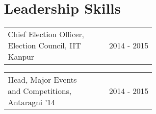 \documentclass[a4paper]{article} %
\newcommand{\verticalspacing}{-0.25cm}
\newcommand{\headspace}{-0.3cm}
\newcommand{\bulletspace}{0.7cm}
\newcommand{\projectheadspacing}{6.9cm}
\newcommand{\gitproject}[3]{%
    \begin{tabular}{p{0.60\linewidth}r}
        \textcolor{NavyBlue}{\small #2} & \multicolumn{1}{m{ \projectheadspacing{} }}{\raggedleft #1}\\
    \end{tabular}\\
    \begin{tabular}{p{0.98\linewidth}}
        \vspace{\headspace{}}
        \small{#3}
    \end{tabular}
    \vspace{\verticalspacing{}}
    \vspace{-0.2cm} %
}
\newcommand{\skill}[2]{%
    \begin{tabular}{p{0.60\linewidth}r}
        \small {#2} & \multicolumn{1}{m{ \projectheadspacing{} }}{\raggedleft \textsc{\small #1}}\\
    \end{tabular}
    \vspace{\verticalspacing{}}
}
\begin{document}
\section {Leadership Skills}

\skill
    {2014 - 2015}
    {Chief Election Officer, Election Council, IIT Kanpur}


\skill
    {2014 - 2015}
    {Head, Major Events and Competitions, Antaragni '14}

\end{document}
